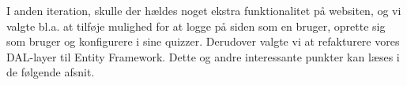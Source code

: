 I anden iteration, skulle der hældes noget ekstra funktionalitet på websiten, og vi valgte bl.a. at tilføje mulighed for at logge på siden som en bruger, oprette sig som bruger og konfigurere i sine quizzer. Derudover valgte vi at refakturere vores DAL-layer til Entity Framework. Dette og andre interessante punkter kan læses i de følgende afsnit.













